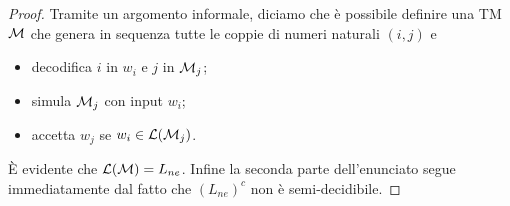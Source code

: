 \documentclass[runningheads,a4paper]{llncs}
\begin{document}
\begin{proof}
Tramite un argomento informale, diciamo che \`{e} possibile definire una TM $\mathcal{M}$ che genera in sequenza tutte le coppie di numeri naturali $(i,j)$ e
\begin{itemize}
\item decodifica $i$ in $w_i$ e $j$ in $\mathcal{M}_j$;
\item simula $\mathcal{M}_j$ con input $w_i$;
\item accetta $w_j$ se $w_i \in \mathcal{L}(\mathcal{M}_j)$.
\end{itemize}
\`{E} evidente che $\mathcal{L}(\mathcal{M}) = L_{ne}$. Infine la seconda parte dell'enunciato segue immediatamente dal fatto che $(L_{ne})^c$ non \`{e} semi-decidibile.
\end{proof}

%
\end{document}
